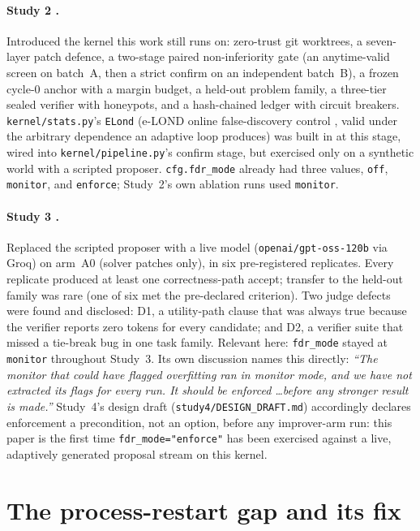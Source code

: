 \documentclass[11pt]{article}
\begin{document}
\paragraph{Study 2 \citep{ouadoukou2026study2}.} Introduced the kernel this work still runs on: zero-trust git worktrees, a seven-layer patch defence, a two-stage paired non-inferiority gate (an anytime-valid screen on batch~A, then a strict confirm on an independent batch~B), a frozen cycle-0 anchor with a margin budget, a held-out problem family, a three-tier sealed verifier with honeypots, and a hash-chained ledger with circuit breakers. \texttt{kernel/stats.py}'s \texttt{ELond} (e-LOND online false-discovery control \citep{xu2024elond}, valid under the arbitrary dependence an adaptive loop produces) was built in at this stage, wired into \texttt{kernel/pipeline.py}'s confirm stage, but exercised only on a synthetic world with a scripted proposer. \texttt{cfg.fdr\_mode} already had three values, \texttt{off}, \texttt{monitor}, and \texttt{enforce}; Study~2's own ablation runs used \texttt{monitor}.

\paragraph{Study 3 \citep{ouadoukou2026study3}.} Replaced the scripted proposer with a live model (\texttt{openai/gpt-oss-120b} via Groq) on arm~A0 (solver patches only), in six pre-registered replicates. Every replicate produced at least one correctness-path accept; transfer to the held-out family was rare (one of six met the pre-declared criterion). Two judge defects were found and disclosed: D1, a utility-path clause that was always true because the verifier reports zero tokens for every candidate; and D2, a verifier suite that missed a tie-break bug in one task family. Relevant here: \texttt{fdr\_mode} stayed at \texttt{monitor} throughout Study~3. Its own discussion names this directly: \emph{``The monitor that could have flagged overfitting ran in monitor mode, and we have not extracted its flags for every run. It should be enforced \ldots before any stronger result is made.''} Study~4's design draft (\texttt{study4/DESIGN\_DRAFT.md}) accordingly declares enforcement a precondition, not an option, before any improver-arm run: this paper is the first time \texttt{fdr\_mode="enforce"} has been exercised against a live, adaptively generated proposal stream on this kernel.

\section{The process-restart gap and its fix}
\label{sec:fix}
\end{document}
